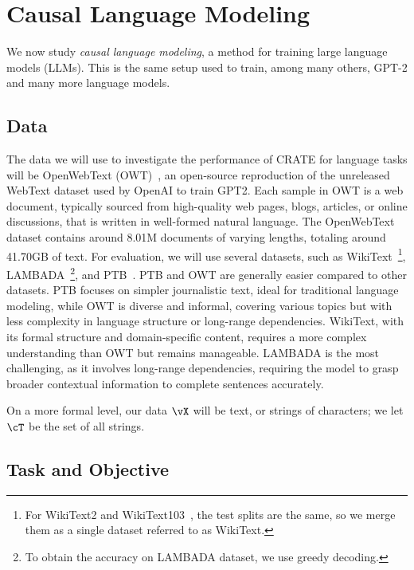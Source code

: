 \documentclass[../../book-main.tex]{subfiles}
\begin{document}
\section{Causal Language Modeling}\label{sec:clm_text}

We now study \textit{causal language modeling}, a method for training large language models (LLMs). This is the same setup used to train, among many others, GPT-2 and many more language models. 

\subsection{Data} \label{sub:clm_text_data}

The data we will use to investigate the performance of CRATE for language tasks will be OpenWebText (OWT)~\cite{Gokaslan2019OpenWeb}, an open-source reproduction of the unreleased WebText dataset used by OpenAI to train GPT2. Each sample in OWT is a web document, typically sourced from high-quality web pages, blogs, articles, or online discussions, that is written in well-formed natural language. The OpenWebText dataset contains around 8.01M documents of varying lengths, totaling around 41.70GB of text. For evaluation, we will use several datasets, such as WikiText~\cite{merity2016pointer}\footnote{For WikiText2 and WikiText103~\cite{merity2016pointer}, the test splits are the same, so we merge them as a single dataset referred to as WikiText.}, LAMBADA~\cite{paperno2016lambadadatasetwordprediction}\footnote{To obtain the accuracy on LAMBADA dataset, we use greedy decoding.}, and PTB~\cite{marcus-etal-1993-building}. PTB and OWT are generally easier compared to other datasets. PTB focuses on simpler journalistic text, ideal for traditional language modeling, while OWT is diverse and informal, covering various topics but with less complexity in language structure or long-range dependencies. WikiText, with its formal structure and domain-specific content, requires a more complex understanding than OWT but remains manageable. LAMBADA is the most challenging, as it involves long-range dependencies, requiring the model to grasp broader contextual information to complete sentences accurately. 

On a more formal level, our data \(\vX\) will be text, or strings of characters; we let \(\cT\) be the set of all strings.

\subsection{Task and Objective} \label{sub:clm_text_objective}
\end{document}
